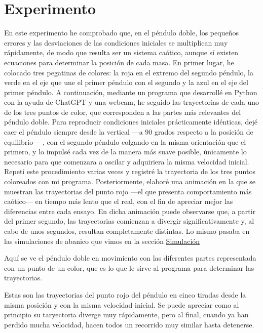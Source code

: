 \documentclass[
  11pt,
  a4paper,
  DIV=11,
  numbers=noendperiod]{scrreprt}
\begin{document}
\section{Experimento}\label{experimento}

En este experimento he comprobado que, en el péndulo doble, los pequeños
errores y las desviaciones de las condiciones iniciales se multiplican
muy rápidamente, de modo que resulta ser un sistema caótico, aunque sí
existen ecuaciones para determinar la posición de cada masa. En primer
lugar, he colocado tres pegatinas de colores: la roja en el extremo del
segundo péndulo, la verde en el eje que une el primer péndulo con el
segundo y la azul en el eje del primer péndulo. A continuación, mediante
un programa que desarrollé en Python con la ayuda de ChatGPT y una
webcam, he seguido las trayectorias de cada uno de los tres puntos de
color, que corresponden a las partes más relevantes del péndulo doble.
Para reproducir condiciones iniciales prácticamente idénticas, dejé caer
el péndulo siempre desde la vertical ---a 90 grados respecto a la
posición de equilibrio--- , con el segundo péndulo colgando en la misma
orientación que el primero, y lo impulsé cada vez de la manera más suave
posible, únicamente lo necesario para que comenzara a oscilar y
adquiriera la misma velocidad inicial. Repetí este procedimiento varias
veces y registré la trayectoria de los tres puntos coloreados con mi
programa. Posteriormente, elaboré una animación en la que se muestran
las trayectorias del punto rojo ---el que presenta comportamiento más
caótico--- en tiempo más lento que el real, con el fin de apreciar mejor
las diferencias entre cada ensayo. En dicha animación puede observarse
que, a partir del primer segundo, las trayectorias comienzan a divergir
significativamente y, al cabo de unos segundos, resultan completamente
distintas. Lo mismo pasaba en las simulaciones de abanico que vimos en
la sección \hyperref[sec-abanico]{Simulación}

Aquí se ve el péndulo doble en movimiento con las diferentes partes
representada con un punto de un color, que es lo que le sirve al
programa para determinar las trayectorias.

Estas son las trayectorias del punto rojo del péndulo en cinco tiradas
desde la misma posición y con la misma velocidad inicial. Se puede
apreciar como al principio su taryectoria diverge muy rápidamente, pero
al final, cuando ya han perdido mucha velocidad, hacen todos un
recorrido muy similar hasta detenerse.
\end{document}
